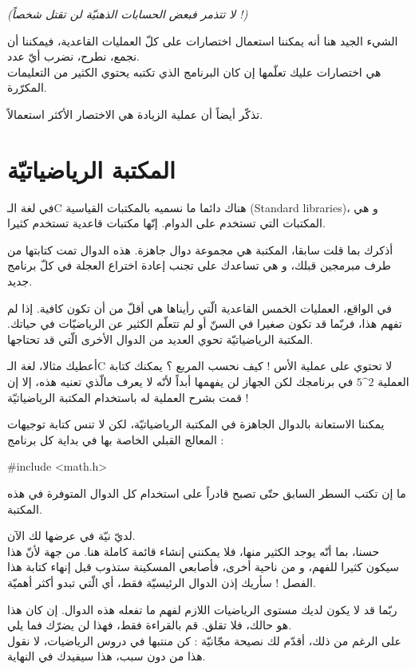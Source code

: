 \textit{(لا تتذمر فبعض الحسابات الذهنيّة لن تقتل شخصاً !)}

الشيء الجيد هنا أنه يمكننا استعمال اختصارات على كلّ العمليات القاعدية، فيمكننا أن نجمع، نطرح، نضرب أيّ عدد.\\
هي اختصارات عليك تعلّمها إن كان البرنامج الذي تكتبه يحتوي الكثير من التعليمات المكرّرة.

تذكّر أيضاً أن عملية الزيادة هي الاختصار الأكثر استعمالاً.

\section{المكتبة الرياضياتيّة}

في لغة الـ\textenglish{C}
هناك دائما ما نسميه بالمكتبات القياسية
(\textenglish{Standard libraries})،
 و هي المكتبات التي تستخدم على الدوام. إنّها مكتبات قاعدية تستخدم كثيرا.

أذكرك بما قلت سابقا، المكتبة هي مجموعة دوال جاهزة. هذه الدوال تمت كتابتها من طرف مبرمجين قبلك، و هي تساعدك على تجنب إعادة اختراع العجلة في كلّ برنامج جديد.

في الواقع، العمليات الخمس القاعدية الّتي رأيناها هي أقلّ من أن تكون كافية. إذا لم تفهم هذا، فربّما قد تكون صغيرا في السنّ أو لم تتعلّم الكثير عن الرياضيّات في حياتك. المكتبة الرياضياتيّة تحوي العديد من الدوال الأخرى الّتي قد تحتاجها.


أعطيك مثالا، لغة الـ\textenglish{C}
لا تحتوي على عملية الأس ! كيف نحسب المربع ؟ يمكنك كتابة العملية
$5\^{}2$
في برنامجك لكن الجهاز لن يفهمها أبداً لأنّه لا يعرف مالّذي تعنيه هذه، إلا إن قمت بشرح العملية له باستخدام المكتبة الرياضياتيّة !

يمكننا الاستعانة بالدوال الجاهزة في المكتبة الرياضياتيّة، لكن لا تنس كتابة توجيهات المعالج القبلي الخاصة بها في بداية كل برنامج :

\begin{Csource}
#include <math.h>
\end{Csource}

ما إن تكتب السطر السابق حتّى تصبح قادراً على استخدام كل الدوال المتوفرة في هذه المكتبة.

لديّ نيّة في عرضها لك الآن.\\
حسنا، بما أنّه يوجد الكثير منها، فلا يمكنني إنشاء قائمة كاملة هنا. من جهة لأنّ هذا سيكون كثيرا للفهم، و من ناحية أخرى، فأصابعي  المسكينة ستذوب قبل إنهاء كتابة هذا الفصل ! سأريك إذن الدوال الرئيسيّة فقط، أي الّتي تبدو أكثر أهميّة.

\begin{information}
ربّما قد لا يكون لديك مستوى  الرياضيات اللازم لفهم ما تفعله هذه الدوال. إن كان هذا هو حالك، فلا تقلق. قم بالقراءة فقط، فهذا لن يضرّك فما يلي.\\
على الرغم من ذلك، أقدّم لك نصيحة مجّانيّة : كن منتبها في دروس الرياضيات، لا نقول هذا من دون سبب، هذا سيفيدك في النهاية.
\end{information}

